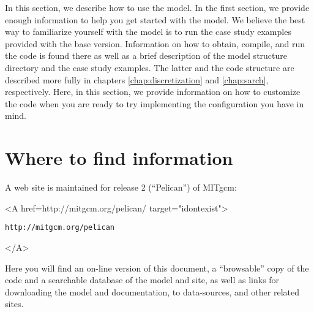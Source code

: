 

In this section, we describe how to use the model. In the first
section, we provide enough information to help you get started with
the model. We believe the best way to familiarize yourself with the
model is to run the case study examples provided with the base
version. Information on how to obtain, compile, and run the code is
found there as well as a brief description of the model structure
directory and the case study examples.  The latter and the code
structure are described more fully in chapters
\ref{chap:discretization} and \ref{chap:sarch}, respectively. Here, in
this section, we provide information on how to customize the code when
you are ready to try implementing the configuration you have in mind.

\section{Where to find information}
\label{sect:whereToFindInfo}

A web site is maintained for release 2 (``Pelican'') of MITgcm:
\begin{rawhtml} <A href=http://mitgcm.org/pelican/ target="idontexist"> \end{rawhtml}
\begin{verbatim}
http://mitgcm.org/pelican
\end{verbatim}
\begin{rawhtml} </A> \end{rawhtml}
Here you will find an on-line version of this document, a
``browsable'' copy of the code and a searchable database of the model
and site, as well as links for downloading the model and
documentation, to data-sources, and other related sites.

